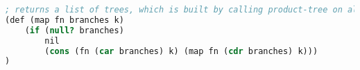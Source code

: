 \begin{lstlisting}[language=Scheme]
; returns a list of trees, which is built by calling product-tree on all children
(def (map fn branches k)
    (if (null? branches)
        nil
        (cons (fn (car branches) k) (map fn (cdr branches) k)))
)
\end{lstlisting}

